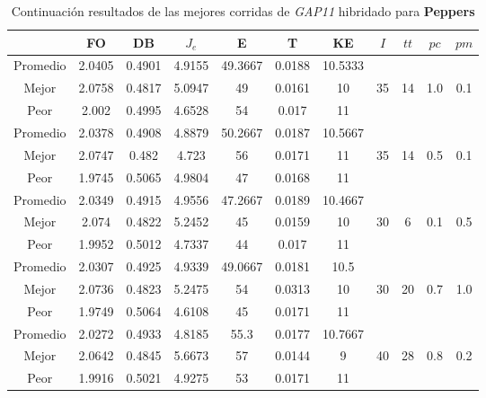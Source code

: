 \begin{table}[h!]
    \footnotesize
    \begin{center}
        \begin{tabular}{|c|c|c|c|c|c|c|c|c|c|c|}
        \hline
             & {\bf FO} & {\bf DB} & $J_e$ & {\bf E} & {\bf T} & {\bf KE} & $I$ & $tt$ & $pc$ & $pm$ \\
        \hline
        \hline
            Promedio  & 2.0405 & 0.4901 & 4.9155 & 49.3667 & 0.0188 & 10.5333 &  &  &  & \\
            \cline{1-7}
            Mejor & 2.0758 & 0.4817  & 5.0947 & 49 & 0.0161 & 10 & 35 & 14 & 1.0 & 0.1\\
            \cline{1-7}
            Peor & 2.002 & 0.4995  & 4.6528 & 54 & 0.017 & 11 &  &  &  & \\
        \hline
        \hline
            Promedio  & 2.0378 & 0.4908 & 4.8879 & 50.2667 & 0.0187 & 10.5667 &  &  &  & \\
            \cline{1-7}
            Mejor & 2.0747 & 0.482  & 4.723 & 56 & 0.0171 & 11 & 35 & 14 & 0.5 & 0.1\\
            \cline{1-7}
            Peor & 1.9745 & 0.5065  & 4.9804 & 47 & 0.0168 & 11 &  &  &  & \\
        \hline
        \hline
            Promedio  & 2.0349 & 0.4915 & 4.9556 & 47.2667 & 0.0189 & 10.4667 &  &  &  & \\
            \cline{1-7}
            Mejor & 2.074 & 0.4822  & 5.2452 & 45 & 0.0159 & 10 & 30 & 6 & 0.1 & 0.5\\
            \cline{1-7}
            Peor & 1.9952 & 0.5012  & 4.7337 & 44 & 0.017 & 11 &  &  &  & \\
        \hline
        \hline
            Promedio  & 2.0307 & 0.4925 & 4.9339 & 49.0667 & 0.0181 & 10.5 &  &  &  & \\
            \cline{1-7}
            Mejor & 2.0736 & 0.4823  & 5.2475 & 54 & 0.0313 & 10 & 30 & 20 & 0.7 & 1.0\\
            \cline{1-7}
            Peor & 1.9749 & 0.5064  & 4.6108 & 45 & 0.0171 & 11 &  &  &  & \\
        \hline
        \hline
            Promedio  & 2.0272 & 0.4933 & 4.8185 & 55.3 & 0.0177 & 10.7667 &  &  &  & \\
            \cline{1-7}
            Mejor & 2.0642 & 0.4845  & 5.6673 & 57 & 0.0144 & 9 & 40 & 28 & 0.8 & 0.2\\
            \cline{1-7}
            Peor & 1.9916 & 0.5021  & 4.9275 & 53 & 0.0171 & 11 &  &  &  & \\
        \hline
        \end{tabular}
        \caption{Continuaci\'on resultados de las mejores corridas de \emph{GAP11} hibridado para {\bf Peppers}}
        \label{tb:tablecGAP11}
    \end{center}
\end{table}
